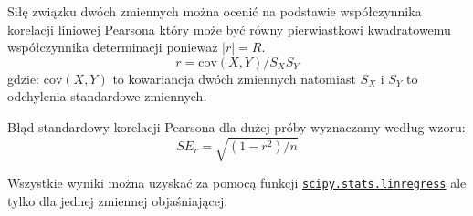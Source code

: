 \documentclass[polish,]{book}
\newenvironment{Shaded}{\begin{snugshade}}{\end{snugshade}}
\newcommand{\BuiltInTok}[1]{#1}
\newcommand{\DecValTok}[1]{\textcolor[rgb]{0.00,0.00,0.81}{#1}}
\newcommand{\FloatTok}[1]{\textcolor[rgb]{0.00,0.00,0.81}{#1}}
\newcommand{\ImportTok}[1]{#1}
\newcommand{\NormalTok}[1]{#1}
\newcommand{\OperatorTok}[1]{\textcolor[rgb]{0.81,0.36,0.00}{\textbf{#1}}}
\newcommand{\SpecialCharTok}[1]{\textcolor[rgb]{0.00,0.00,0.00}{#1}}
\newcommand{\StringTok}[1]{\textcolor[rgb]{0.31,0.60,0.02}{#1}}
\begin{document}
Siłę związku dwóch zmiennych można ocenić na podstawie współczynnika korelacji liniowej Pearsona który może być równy pierwiastkowi kwadratowemu współczynnika determinacji ponieważ \(|r|=R\).
\begin{equation}
r=\mathrm{cov}(X,Y)/S_XS_Y
\label{eq:cor}
\end{equation}
gdzie: \(\mathrm{cov}(X,Y)\) to kowariancja dwóch zmiennych natomiast \(S_X\) i \(S_Y\) to odchylenia standardowe zmiennych.

Błąd standardowy korelacji Pearsona dla dużej próby wyznaczamy według wzoru:
\begin{equation}
SE_{r}=\sqrt{(1-r^2)/n}
\label{eq:SEcor}
\end{equation}

Wszystkie wyniki można uzyskać za pomocą funkcji \href{https://docs.scipy.org/doc/scipy/reference/generated/scipy.stats.linregress.html\#scipy.stats.linregress}{\texttt{scipy.stats.linregress}} ale tylko dla jednej zmiennej objaśniającej.

\begin{Shaded}
\end{Shaded}
\end{document}
